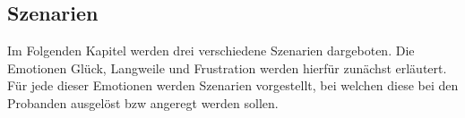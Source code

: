 \subsection{Szenarien} \label{szenarien-1}



Im Folgenden Kapitel werden drei verschiedene Szenarien dargeboten. Die Emotionen Glück, Langweile und Frustration werden hierfür zunächst erläutert. Für jede dieser Emotionen werden Szenarien vorgestellt, bei welchen diese bei den Probanden ausgelöst bzw angeregt werden sollen.






